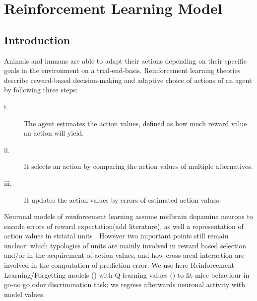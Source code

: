 \chapter{Reinforcement Learning Model}
\section{Introduction}
Animals and humans are able to adapt their actions depending on their specific goals in the environment on a trial-end-basis.
Reinforcement learning theories describe reward-based decision-making and adaptive choice of actions of an agent by following three steps: 
\begin{description}
    \item[i.]The agent estimates the action values, defined as how much reward value an action will yield.
    \item[ii.]It selects an action by comparing the action values of multiple alternatives.
    \item[iii.]It updates the action values by errors of estimated action values.
\end{description}
Neuronal models of reinforcement learning assume midbrain dopamine neurons to encode errors of reward expectation({\color{red}add literature}), as well a representation of action values in striatal units \cite{DoyaRL_VS}. However two important points still remain unclear: which typologies of units are mainly involved in reward based selection and/or in the acquirement of action values, and how cross-areal interaction are involved in the computation of prediction error.
We use here Reinforcement Learning/Forgetting models (\cite{SuttonBarto}) with Q-learning values (\cite{Dayan1}) to fit mice behaviour in go-no go odor discrimination task; we regress afterwards neuronal activity with model values.
